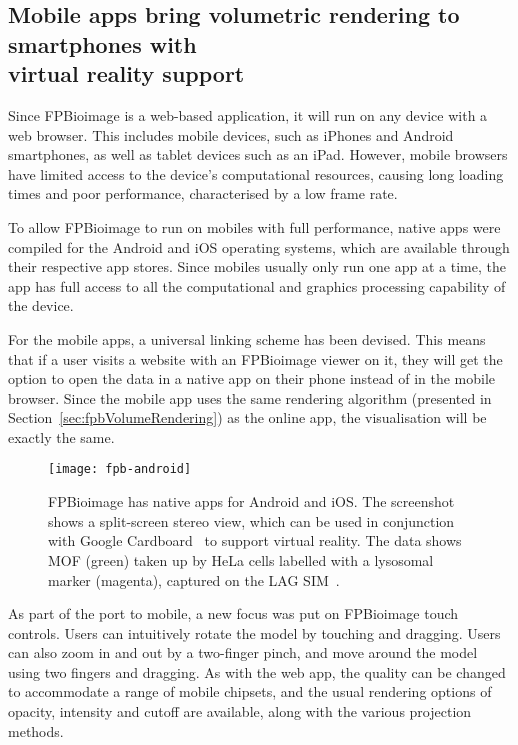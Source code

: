 \subsection[Mobile apps bring volumetric rendering to smartphones with virtual reality support]{Mobile apps bring volumetric rendering to smartphones with\\ virtual reality support}
Since FPBioimage is a web-based application, it will run on any device with a web browser.
This includes mobile devices, such as iPhones and Android smartphones, as well as tablet devices such as an iPad.
However, mobile browsers have limited access to the device's computational resources, causing long loading times and poor performance, characterised by a low frame rate.

To allow FPBioimage to run on mobiles with full performance, native apps were compiled for the Android and iOS operating systems, which are available through their respective app stores.
Since mobiles usually only run one app at a time, the app has full access to all the computational and graphics processing capability of the device.

For the mobile apps, a universal linking scheme has been devised.
This means that if a user visits a website with an FPBioimage viewer on it, they will get the option to open the data in a native app on their phone instead of in the mobile browser.
Since the mobile app uses the same rendering algorithm (presented in Section~\ref{sec:fpbVolumeRendering}) as the online app, the visualisation will be exactly the same.

\begin{figure}[t!]
\centering
\texttt{[image: fpb-android]}
\caption[FPBioimage: The FPBioimage mobile app provides volumetric rendering in virtual reality]{FPBioimage has native apps for Android and iOS. The screenshot shows a split-screen stereo view, which can be used in conjunction with Google Cardboard~\cite{cardboard} to support virtual reality. The data shows MOF (green) taken up by HeLa cells labelled with a lysosomal marker (magenta), captured on the LAG SIM~\cite{teplensky2017temperature}. } %
\label{fig:fpbMobile}
\end{figure}

As part of the port to mobile, a new focus was put on FPBioimage touch controls.
Users can intuitively rotate the model by touching and dragging.
Users can also zoom in and out by a two-finger pinch, and move around the model using two fingers and dragging.
As with the web app, the quality can be changed to accommodate a range of mobile chipsets, and the usual rendering options of opacity, intensity and cutoff are available, along with the various projection methods.

